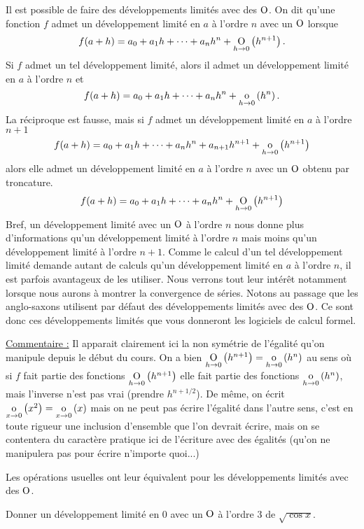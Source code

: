 \documentclass{magnolia}
\begin{document}
\begin{remarques}
\remarque Il est possible de faire des développements limités avec des ${\rm O}$. On dit qu'une fonction $f$ admet un développement limité en $a$ à l'ordre $n$ avec un ${\rm O}$ lorsque
\[f(a+h)=a_0+a_1 h+\cdots+a_n h^n+\underset{h \rightarrow 0}{\text{O}}\left(h^{n+1}\right).\]
Si $f$ admet un tel développement limité, alors il admet un développement limité en $a$ à l'ordre $n$ et
\[f(a+h)=a_0+a_1 h+\cdots+a_n h^n+\underset{h \rightarrow 0}{\text{o}}\left(h^n\right).\]
La réciproque est fausse, mais si $f$ admet un développement limité en $a$ à l'ordre $n+1$
\[f(a+h)=a_0+a_1 h+\cdots+a_n h^n+a_{n+1} h^{n+1}+\underset{h \rightarrow 0}{\text{o}}\left(h^{n+1}\right)\]
alors elle admet un développement limité en $a$ à l'ordre $n$ avec un ${\rm O}$ obtenu par troncature.
\[f(a+h)=a_0+a_1 h+\cdots+a_n h^n+\underset{h \rightarrow 0}{\text{O}}\left(h^{n+1}\right)\]
Bref, un développement limité avec un ${\rm O}$ à l'ordre $n$ nous donne plus d'informations qu'un développement limité à l'ordre $n$ mais moins qu'un développement limité à l'ordre $n+1$. Comme le calcul d'un tel développement limité demande autant de calculs qu'un développement limité en $a$ à l'ordre $n$, il est parfois avantageux de les utiliser. Nous verrons tout leur intérêt notamment lorsque nous aurons à montrer la convergence de séries. Notons au passage que les anglo-saxons utilisent par défaut des développements limités avec des ${\rm O}$. Ce sont donc ces développements limités que vous donneront les logiciels de calcul formel.
\begin{sol}
\underline{Commentaire  :} Il apparait clairement ici la non symétrie de l'égalité qu'on manipule depuis le début du cours. On a bien $\underset{h \rightarrow 0}{\text{O}}\left(h^{n+1}\right)=\underset{h \rightarrow 0}{\text{o}}\left(h^n\right)$ au sens où si $f$ fait partie des fonctions $\underset{h \rightarrow 0}{\text{O}}\left(h^{n+1}\right)$ elle fait partie des fonctions $\underset{h \rightarrow 0}{\text{o}}\left(h^n\right)$, mais l'inverse n'est pas vrai (prendre $h^{n+1/2}$). De même, on écrit $\underset{x \rightarrow 0}{\text{o}}\left(x^2\right)=\underset{x \rightarrow 0}{\text{o}}\left(x\right)$ mais on ne peut pas écrire l'égalité dans l'autre sens, c'est en  toute rigueur une inclusion d'ensemble que l'on devrait écrire, mais on se contentera du caractère pratique ici de l'écriture avec des égalités (qu'on ne manipulera pas pour écrire n'importe quoi...)
\end{sol}

\remarque Les opérations usuelles ont leur équivalent pour les développements limités avec des ${\rm O}$.
\end{remarques}

\begin{exoUnique}
\exo Donner un développement limité en 0 avec un ${\rm O}$ à l'ordre 3 de $\sqrt{\cos x}$.
\end{exoUnique}
\end{document}
